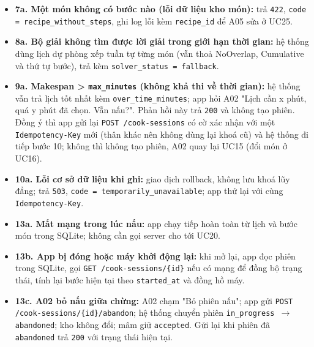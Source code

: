 \begin{itemize}
\item \textbf{7a. Một món không có bước nào (lỗi dữ liệu kho món):} trả {\small\texttt{422}}, {\small\texttt{code = recipe\_\allowbreak{}\allowbreak{}without\_\allowbreak{}\allowbreak{}steps}}, ghi log lỗi kèm {\small\texttt{recipe\_\allowbreak{}\allowbreak{}id}} để A05 sửa ở UC25.
\item \textbf{8a. Bộ giải không tìm được lời giải trong giới hạn thời gian:} hệ thống dùng lịch dự phòng xếp tuần tự từng món (vẫn thoả NoOverlap, Cumulative và thứ tự bước), trả kèm {\small\texttt{solver\_\allowbreak{}\allowbreak{}status = fallback}}.
\item \textbf{9a. Makespan > {\small\texttt{max\_\allowbreak{}\allowbreak{}minutes}} (không khả thi về thời gian):} hệ thống vẫn trả lịch tốt nhất kèm {\small\texttt{over\_\allowbreak{}\allowbreak{}time\_\allowbreak{}\allowbreak{}minutes}}; app hỏi A02 "Lịch cần x phút, quá y phút đã chọn. Vẫn nấu?". Phản hồi này trả {\small\texttt{200}} và không tạo phiên. Đồng ý thì app gửi lại {\small\texttt{POST /\allowbreak{}\allowbreak{}cook-\allowbreak{}sessions}} có cờ xác nhận với một {\small\texttt{Idempotency-\allowbreak{}Key}} mới (thân khác nên không dùng lại khoá cũ) và hệ thống đi tiếp bước 10; không thì không tạo phiên, A02 quay lại UC15 (đổi món ở UC16).
\item \textbf{10a. Lỗi cơ sở dữ liệu khi ghi:} giao dịch rollback, không lưu khoá lũy đẳng; trả {\small\texttt{503}}, {\small\texttt{code = temporarily\_\allowbreak{}\allowbreak{}unavailable}}; app thử lại với cùng {\small\texttt{Idempotency-\allowbreak{}Key}}.
\item \textbf{13a. Mất mạng trong lúc nấu:} app chạy tiếp hoàn toàn từ lịch và bước món trong SQLite; không cần gọi server cho tới UC20.
\item \textbf{13b. App bị đóng hoặc máy khởi động lại:} khi mở lại, app đọc phiên trong SQLite, gọi {\small\texttt{GET /\allowbreak{}\allowbreak{}cook-\allowbreak{}sessions/\allowbreak{}\allowbreak{}\{id\}}} nếu có mạng để đồng bộ trạng thái, tính lại bước hiện tại theo {\small\texttt{started\_\allowbreak{}\allowbreak{}at}} và đồng hồ máy.
\item \textbf{13c. A02 bỏ nấu giữa chừng:} A02 chạm "Bỏ phiên nấu"; app gửi {\small\texttt{POST /\allowbreak{}\allowbreak{}cook-\allowbreak{}sessions/\allowbreak{}\allowbreak{}\{id\}/\allowbreak{}\allowbreak{}abandon}}; hệ thống chuyển phiên {\small\texttt{in\_\allowbreak{}\allowbreak{}progress \ensuremath{\rightarrow} abandoned}}; kho không đổi; mâm giữ {\small\texttt{accepted}}. Gửi lại khi phiên đã {\small\texttt{abandoned}} trả {\small\texttt{200}} với trạng thái hiện tại.

\end{itemize}
